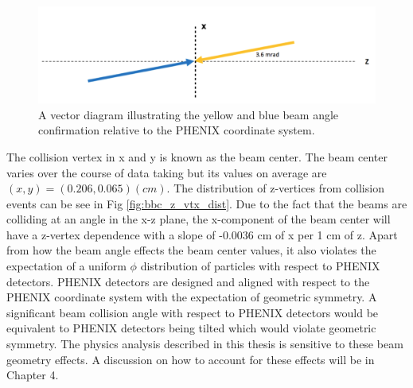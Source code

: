 \begin{figure}[h!]
\begin{center}
\includegraphics[width=0.85\linewidth]{figs/beam_angle.png}
\caption{A vector diagram illustrating the yellow and blue beam angle confirmation relative to the PHENIX coordinate system.}\label{fig:beam_angle}
\end{center}
\end{figure}

The collision vertex in x and y is known as the beam center. The beam center varies over the course of data taking but its values on average are $(x,y) = (0.206,0.065) (cm)$. The distribution of z-vertices from collision events can be see in Fig \ref{fig:bbc_z_vtx_dist}. Due to the fact that the beams are colliding at an angle in the x-z plane, the x-component of the beam center will have a z-vertex dependence with a slope of -0.0036 cm of x per 1 cm of z.
Apart from how the beam angle effects the beam center values, it also violates the expectation of a uniform $\phi$ distribution of particles with respect to PHENIX detectors. PHENIX detectors are designed and aligned with respect to the PHENIX coordinate system with the expectation of geometric symmetry. A significant beam collision angle with respect to PHENIX detectors would be equivalent to PHENIX detectors being tilted which would violate geometric symmetry.
The physics analysis described in this thesis is sensitive to these beam geometry effects. A discussion on how to account for these effects will be in Chapter 4.



